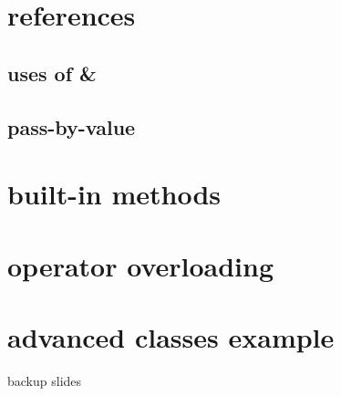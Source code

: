 

\section{references}

%



\subsection{uses of \&}



\subsection{pass-by-value}

%





\section{built-in methods}



\section{operator overloading}





\section{advanced classes example}



\begin{frame}{backup slides}
\end{frame}


